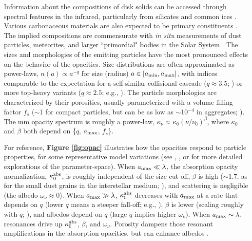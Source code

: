 \documentclass[a4paper]{ar-1col}
\begin{document}
Information about the compositions of disk solids can be accessed through spectral features in the infrared, particularly from silicates \citep{kessler-silacci06,bouwman08,sargent09b} and common ices \citep{oberg08,bottinelli10,mcclure15}.  Various carbonaceous materials are also expected to be primary constituents \citep{zubko96,jaeger98}.  The implied compositions are commensurate with {\it in situ} measurements of dust particles, meteorites, and larger ``primordial" bodies in the Solar System \citep[e.g.,][]{clayton04,mumma11}.  The sizes and morphologies of the emitting particles have the most pronounced effects on the behavior of the opacities.  Size distributions are often approximated as power-laws, $n(a) \propto a^{-q}$ for size (radius) $a \in [a_{\rm min}, a_{\rm max}]$, with indices comparable to the expectation for a self-similar collisional cascade ($q \approx 3.5$; \citealt{dohnanyi69,tanaka96}) or more top-heavy variants ($q \approx 2.5$; e.g., \citealt{birnstiel11}).  The particle morphologies are characterized by their porosities, usually parameterized with a volume filling factor $f_s$ ($\sim$1 for compact particles, but can be as low as $\sim$10$^{-4}$ in aggregates; \citealt{kataoka13}).  The mm opacity spectrum is roughly a power-law, $\kappa_\nu \approx \kappa_0 (\nu/\nu_0)^\beta$, where $\kappa_0$ and $\beta$ both depend on \{$q$, $a_{\rm max}$, $f_s$\}.  

For reference, {\bf Figure \ref{fig:opac}} illustrates how the opacities respond to particle properties, for some representative model variations (see \citealt{cuzzi14}, \citealt{woitke16}, or \citealt{dsharp5} for more detailed explorations of the parameter-space). When $a_{\rm max} \ll \lambda$, the absorption opacity normalization, $\kappa_0^{\rm abs}$, is roughly independent of the size cut-off, $\beta$ is high ($\sim$1.7, as for the small dust grains in the interstellar medium; \citealt{finkbeiner99}), and scattering is negligible (the albedo $\omega_\nu \approx 0$).  When $a_{\rm max} \gg \lambda$, $\kappa_0^{\rm abs}$ decreases with $a_{\rm max}$ at a rate that depends on $q$ (lower $q$ means a steeper fall-off; e.g., \citealt{ricci10a}), $\beta$ is lower (scaling roughly with $q$; \citealt{draine06}), and albedos depend on $q$ (large $q$ implies higher $\omega_\nu$).  When $a_{\rm max} \sim \lambda$, resonances drive up $\kappa_0^{\rm abs}$, $\beta$, and $\omega_\nu$.  Porosity dampens those resonant amplifications in the absorption opacities, but can enhance albedos \citep{kataoka14}.  
\end{document}
